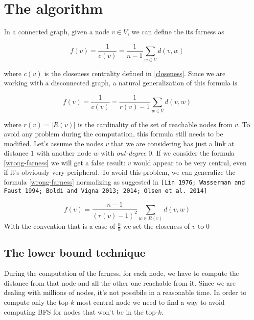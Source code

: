 \section{The algorithm}

In a connected graph, given a node $v \in V$, we can define the its farness as

\begin{equation}
    f(v) = \frac{1}{c(v)} = \frac{1}{n-1} \displaystyle \sum_{w \in V} d(v,w)
\end{equation}

where $c(v)$ is the closeness centrality defined in \eqref{closeness}. Since we are working with a disconnected graph, a natural generalization of this formula is

\begin{equation}\label{wrong-farness}
    f(v) = \frac{1}{c(v)} = \frac{1}{r(v)-1} \displaystyle \sum_{w \in V} d(v,w)
\end{equation}

where $r(v) = |R(v)|$ is the cardinality of the set of reachable nodes from $v$. To avoid any problem during the computation, this formula still needs to be modified. Let's assume the nodes $v$ that we are considering has just a link at distance $1$ with another node $w$ with \emph{out-degree} 0. If we consider the formula \eqref{wrong-farness} we will get a false result: $v$ would appear to be very central, even if it's obviously very peripheral. To avoid this problem, we can generalize the formula \eqref{wrong-farness} normalizing as suggested in \texttt{[Lin 1976; Wasserman and Faust 1994; Boldi and Vigna 2013; 2014; Olsen et al. 2014]}

\begin{equation}\label{farness}
    f(v) = \frac{n-1}{(r(v)-1)^2} \sum_{w \in R(v)} d(v,w)
\end{equation}
With the convention that is a case of $\frac{0}{0}$ we set the closeness of $v$ to 0

\subsection{The lower bound technique}
During the computation of the farness, for each node, we have to compute the distance from that node and all the other one reachable from it. Since we are dealing with millions of nodes, it's not possibile in a reasonable time. In order to compute only the top-$k$ most central node we need to find a way to avoid computing BFS for nodes that won't be in the top-$k$. \\

